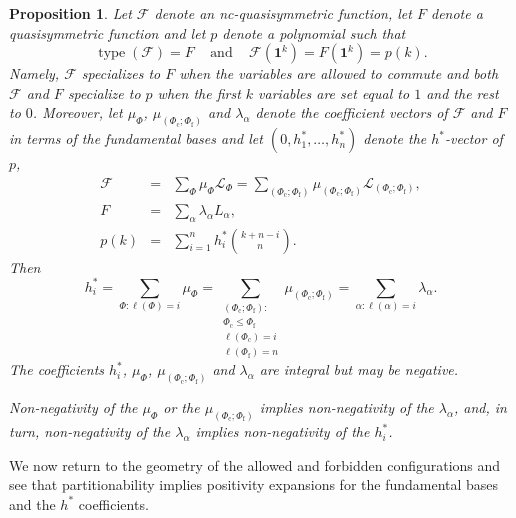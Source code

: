 \documentclass[12pt,reqno]{amsart}
\numberwithin{definition}{section}
\newtheorem{proposition}[definition]{Proposition}
\theoremstyle{definition}
\newcommand{\SSS}{\mathcal{S}}
\newcommand{\type}{\operatorname{type}}
\newcommand{\ncL}{\mathcal{L}}
\newcommand{\poly}{\chi} %
\begin{document}
\begin{proposition}
Let $\mathcal{F}$ denote an nc-quasisymmetric function, let $F$ denote a quasisymmetric function and let $p$ denote a polynomial such that
\[
  \type(\mathcal{F}) = F \;\;\; \text{ and } \;\;\; \mathcal{F}(\mathbf{1}^k) = F(\mathbf{1}^k) = p(k).
\]
Namely, $\mathcal{F}$ specializes to $F$ when the variables are allowed to commute and both $\mathcal{F}$ and $F$ specialize to $p$ when the first $k$ variables are set equal to $1$ and the rest to $0$.   Moreover, let $\mu_\Phi$, $\mu_{(\Phi_\text{c};\Phi_\text{f})}$ and $\lambda_\alpha$ denote the coefficient vectors of $\mathcal{F}$ and $F$ in terms of the fundamental bases and let $(0,h^*_1,\ldots,h^*_n)$ denote the $h^*$-vector of $p$,
\begin{eqnarray*}
  \mathcal{F} &=& \sum_\Phi \mu_\Phi \ncL_\Phi = \sum_{(\Phi_\text{c};\Phi_\text{f})} \mu_{(\Phi_\text{c};\Phi_\text{f})} \ncL_{(\Phi_\text{c};\Phi_\text{f})}, \\
  F &=& \sum_{\alpha} \lambda_\alpha L_\alpha,\\
  p(k) &=& \sum_{i=1}^n h^*_i \binom{k+n-i}{n}.
\end{eqnarray*}
Then
\[
  h^*_i 
  = \sum_{\Phi: \ell(\Phi) = i} \mu_\Phi 
  =
   \sum_{\substack{(\Phi_\text{c};\Phi_\text{f}): 
        \\ \Phi_\text{c} \leq \Phi_\text{f}
        \\ \ell(\Phi_\text{c}) = i
        \\ \ell(\Phi_\text{f}) = n
   }} \mu_{(\Phi_\text{c};\Phi_\text{f})}
  = \sum_{\alpha: \ell(\alpha)=i} \lambda_\alpha.
\]
The coefficients $h_i^*$, $\mu_\Phi$, $\mu_{(\Phi_\text{c};\Phi_\text{f})}$ and $\lambda_\alpha$ are integral but may be negative. 

Non-negativity of the $\mu_\Phi$ or the $\mu_{(\Phi_\text{c};\Phi_\text{f})}$ implies non-negativity of the $\lambda_\alpha$, and, in turn, non-negativity of the $\lambda_\alpha$ implies non-negativity of the $h^*_i$.
\end{proposition}


We now return to the geometry of the allowed and forbidden configurations and see that partitionability implies positivity expansions for the fundamental bases and the $h^*$ coefficients. 


\end{document}
